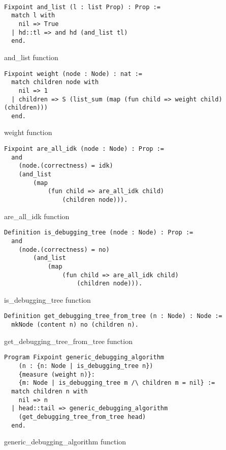 \begin{listing}[!ht]
\begin{verbatim}

Fixpoint and_list (l : list Prop) : Prop :=
  match l with
    nil => True
  | hd::tl => and hd (and_list tl)
  end.

\end{verbatim}
\caption{and\_list function}
\label{listing:4}
\end{listing}

\begin{listing}[!ht]
\begin{verbatim}
Fixpoint weight (node : Node) : nat :=
  match children node with
    nil => 1
  | children => S (list_sum (map (fun child => weight child) (children)))
  end.
\end{verbatim}
\caption{weight function}
\label{listing:4}
\end{listing}

\begin{listing}[!ht]
\begin{verbatim}
Fixpoint are_all_idk (node : Node) : Prop :=
  and
    (node.(correctness) = idk)
    (and_list
        (map
            (fun child => are_all_idk child)
                (children node))).
\end{verbatim}
\caption{are\_all\_idk function}
\label{listing:4}
\end{listing}


\begin{listing}[!ht]
\begin{verbatim}
Definition is_debugging_tree (node : Node) : Prop :=
  and
    (node.(correctness) = no)
        (and_list
            (map
                (fun child => are_all_idk child)
                    (children node))).
\end{verbatim}
\caption{is\_debugging\_tree function}
\label{listing:4}
\end{listing}


\begin{listing}[!ht]
\begin{verbatim}
Definition get_debugging_tree_from_tree (n : Node) : Node :=
  mkNode (content n) no (children n).
\end{verbatim}
\caption{get\_debugging\_tree\_from\_tree function}
\label{listing:4}
\end{listing}


\begin{listing}[!ht]
\begin{verbatim}
Program Fixpoint generic_debugging_algorithm
    (n : {n: Node | is_debugging_tree n})
    {measure (weight n)}:
    {m: Node | is_debugging_tree m /\ children m = nil} :=
  match children n with
    nil => n
  | head::tail => generic_debugging_algorithm
    (get_debugging_tree_from_tree head)
  end.
\end{verbatim}
\caption{generic\_debugging\_algorithm function}
\label{listing:4}
\end{listing}

